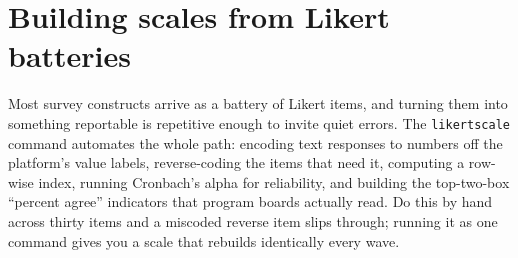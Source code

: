 \documentclass[
    a4paper,
    fontsize=10pt,
    twoside=true,
    numbers=noenddot,
]{kaobook}
\begin{document}
\section{Building scales from Likert batteries}
Most survey constructs arrive as a battery of Likert items, and turning them into something reportable is repetitive enough to invite quiet errors. The \texttt{likertscale} command automates the whole path: encoding text responses to numbers off the platform's value labels, reverse-coding the items that need it, computing a row-wise index, running Cronbach's alpha \parencite{cronbach1951alpha} for reliability, and building the top-two-box \enquote{percent agree} indicators that program boards actually read. Do this by hand across thirty items and a miscoded reverse item slips through; running it as one command gives you a scale that rebuilds identically every wave.
\end{document}
